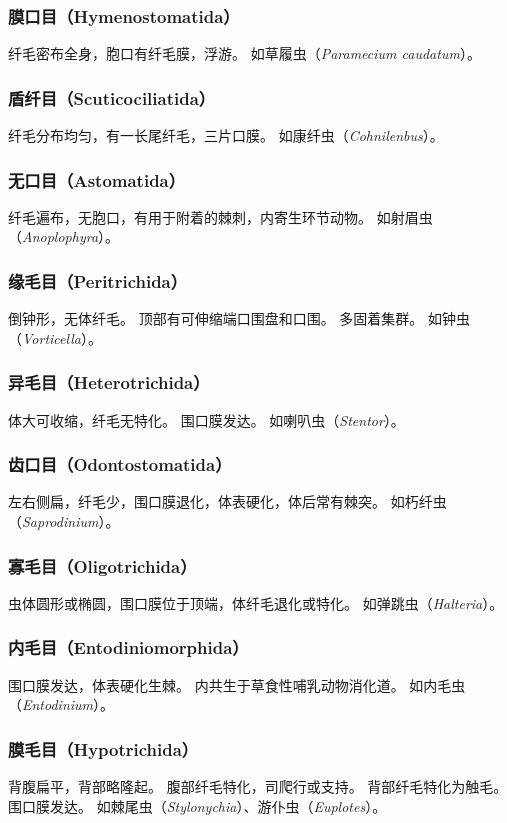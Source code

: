 \documentclass[11pt]{article}
\begin{document}
\subsubsection{膜口目（Hymenostomatida）}
纤毛密布全身，胞口有纤毛膜，浮游。
如草履虫（\textit{Paramecium caudatum}）。

\subsubsection{盾纤目（Scuticociliatida）}
纤毛分布均匀，有一长尾纤毛，三片口膜。
如康纤虫（\textit{Cohnilenbus}）。

\subsubsection{无口目（Astomatida）}
纤毛遍布，无胞口，有用于附着的棘刺，内寄生环节动物。
如射眉虫（\textit{Anoplophyra}）。

\subsubsection{缘毛目（Peritrichida）}
倒钟形，无体纤毛。
顶部有可伸缩端口围盘和口围。
多固着集群。
如钟虫（\textit{Vorticella}）。

\subsubsection{异毛目（Heterotrichida）}
体大可收缩，纤毛无特化。
围口膜发达。
如喇叭虫（\textit{Stentor}）。

\subsubsection{齿口目（Odontostomatida）}
左右侧扁，纤毛少，围口膜退化，体表硬化，体后常有棘突。
如朽纤虫（\textit{Saprodinium}）。

\subsubsection{寡毛目（Oligotrichida）}
虫体圆形或椭圆，围口膜位于顶端，体纤毛退化或特化。
如弹跳虫（\textit{Halteria}）。

\subsubsection{内毛目（Entodiniomorphida）}
围口膜发达，体表硬化生棘。
内共生于草食性哺乳动物消化道。
如内毛虫（\textit{Entodinium}）。

\subsubsection{膜毛目（Hypotrichida）}
背腹扁平，背部略隆起。
腹部纤毛特化，司爬行或支持。
背部纤毛特化为触毛。
围口膜发达。
如棘尾虫（\textit{Stylonychia}）、游仆虫（\textit{Euplotes}）。
\end{document}
